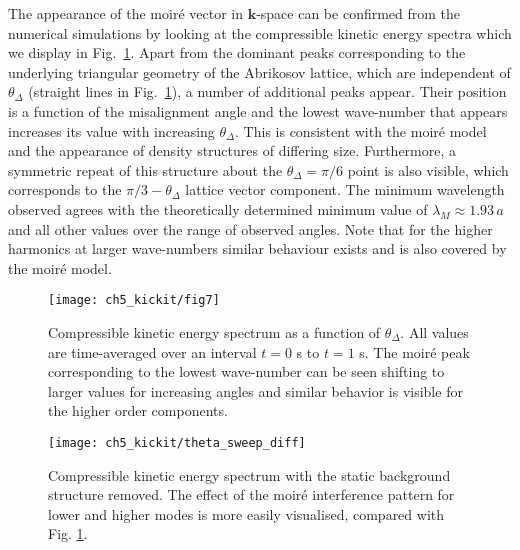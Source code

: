     The appearance of the moir\'e vector in $\mathbf{k}$-space can be confirmed from the numerical simulations by looking at the compressible kinetic energy spectra which we display in Fig.~\ref{fig:dtheta_kspec}. Apart from the dominant peaks corresponding to the underlying triangular geometry of the Abrikosov lattice, which are independent of $\theta_\Delta$ (straight lines in Fig.~\ref{fig:dtheta_kspec}), a number of additional peaks appear. Their position is a function of the misalignment angle and the lowest wave-number that appears increases its value with increasing $\theta_\Delta$. This is consistent with the moir\'e model and the appearance of density structures of differing size. Furthermore, a symmetric repeat of this structure about the $\theta_\Delta=\pi/6$ point is also visible, which corresponds to the $\pi/3 - \theta_\Delta$ lattice vector component. The minimum wavelength observed agrees with the theoretically determined minimum value of $\lambda_M\approx 1.93\,a$ and all other values over the range of observed angles. Note that for the higher harmonics at larger wave-numbers similar behaviour exists and is also covered by the moir\'e model.
	\begin{figure}[tb]
        \centering
		\texttt{[image: ch5\_kickit/fig7]}
		\caption[Compressible kinetic energy spectrum as a function of $\theta_\Delta$.]{Compressible kinetic energy spectrum as a function of $\theta_\Delta$. All values are time-averaged over an interval $t=0$ s to $t=1$ s. The moir\'e peak corresponding to the lowest wave-number can be seen shifting to larger values for increasing angles and similar behavior is visible for the higher order components.}
		\label{fig:dtheta_kspec}
	\end{figure}
    \begin{figure}[tb]
        \centering
        \texttt{[image: ch5\_kickit/theta\_sweep\_diff]}
        \caption[Compressible kinetic energy spectrum with the background structure removed.]{Compressible kinetic energy spectrum with the static background structure removed. The effect of the moir\'e interference pattern for lower and higher modes is more easily visualised, compared with Fig. \ref{fig:dtheta_kspec}.}
        \label{fig:dtheta_kspec_backg}
    \end{figure}


